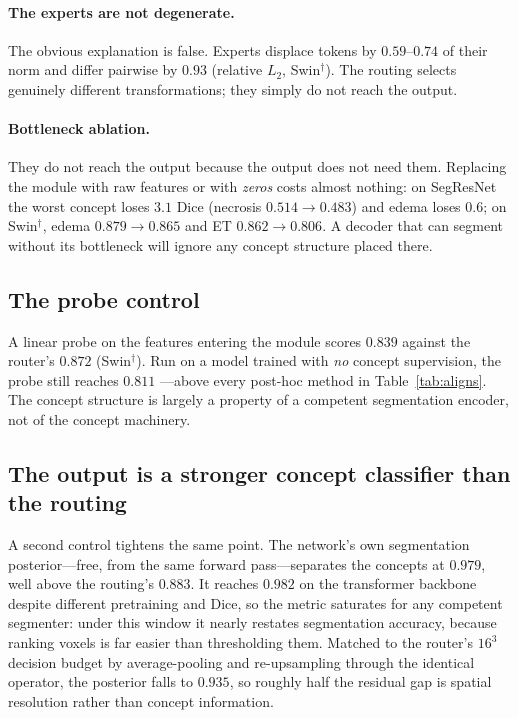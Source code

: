 \paragraph{The experts are not degenerate.}
The obvious explanation is false. Experts displace tokens by $0.59$--$0.74$ of their norm and
differ pairwise by $0.93$ (relative $L_2$, Swin$^\dagger$). The routing selects genuinely different
transformations; they simply do not reach the output.

\paragraph{Bottleneck ablation.}
They do not reach the output because the output does not need them. Replacing the module with raw
features or with \emph{zeros} costs almost nothing: on SegResNet the worst concept loses $3.1$
Dice (necrosis $0.514\!\to\!0.483$) and edema loses $0.6$; on Swin$^\dagger$, edema
$0.879\!\to\!0.865$ and ET $0.862\!\to\!0.806$. A decoder that can segment without its bottleneck will ignore any concept
structure placed there.

\subsection{The probe control}
\label{sec:probe}
A linear probe on the features entering the module scores $0.839$ against the router's
$0.872$ (Swin$^\dagger$).
Run on a model trained with \emph{no} concept supervision, the probe still reaches $\mathbf{0.811}$
---above every post-hoc method in Table~\ref{tab:aligns}. The concept structure is largely a
property of a competent segmentation encoder, not of the concept machinery.

\subsection{The output is a stronger concept classifier than the routing}
\label{sec:segpost}
A second control tightens the same point. The network's own segmentation posterior---free, from
the same forward pass---separates the concepts at $0.979$, well above the routing's $0.883$. It
reaches $0.982$ on the transformer backbone despite different pretraining and Dice, so the metric
saturates for any competent segmenter: under this window it nearly restates segmentation accuracy,
because ranking voxels is far easier than thresholding them. Matched to the router's $16^3$ decision budget by average-pooling and re-upsampling through
the identical operator, the posterior falls to $0.935$, so roughly half the residual gap is
spatial resolution rather than concept information.

